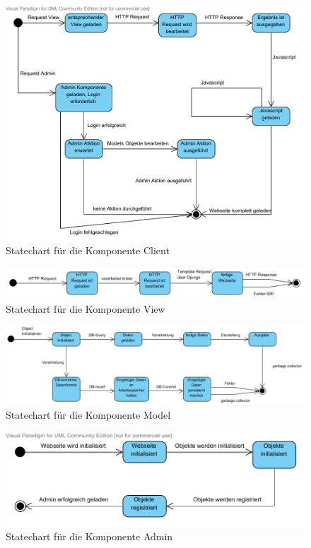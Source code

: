 \begin{figure}
\includegraphics[width=0.8\linewidth]{bilder/KompClient.pdf}
\caption{Statechart für die Komponente Client}
\label{StClient}
\end{figure}

\begin{figure}
\includegraphics[width=0.8\linewidth]{bilder/KompView.pdf}
\caption{Statechart für die Komponente View}
\label{StView}
\end{figure}

\begin{figure}
\includegraphics[width=0.8\linewidth]{bilder/KompModel.pdf}
\caption{Statechart für die Komponente Model}
\label{StModel}
\end{figure}

\begin{figure}
\includegraphics[width=0.8\linewidth]{bilder/KompAdmin.pdf}
\caption{Statechart für die Komponente Admin}
\label{StAdmin}
\end{figure}







